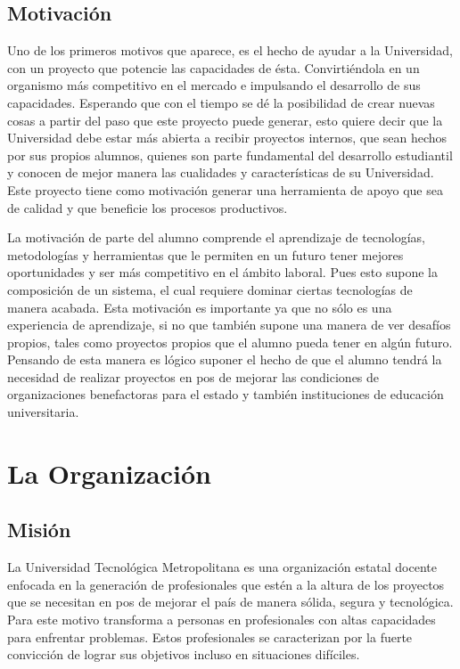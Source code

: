 \documentclass[a4paper,12pt,openany,oneside]{book}
\begin{document}
\section{Motivación}
Uno de los primeros motivos que aparece, es el hecho de ayudar a la Universidad, con un proyecto que potencie las capacidades de ésta. Convirtiéndola en un organismo más competitivo en el mercado e impulsando el desarrollo de sus capacidades. Esperando que con el tiempo se dé la posibilidad de crear nuevas cosas a partir del paso que este proyecto puede generar, esto quiere decir que la Universidad debe estar más abierta a recibir proyectos internos, que sean hechos por sus propios alumnos, quienes son parte fundamental del desarrollo estudiantil y conocen de mejor manera las cualidades y características de su Universidad. Este proyecto tiene como motivación generar una herramienta de apoyo que sea de calidad y que beneficie los procesos productivos.

La motivación de parte del alumno comprende el aprendizaje de tecnologías, metodologías y herramientas que le permiten en un futuro tener mejores oportunidades y ser más competitivo en el ámbito laboral. Pues esto supone la composición de un sistema, el cual requiere dominar ciertas tecnologías de manera acabada. Esta motivación es importante ya que no sólo es una experiencia de aprendizaje, si no que también supone una manera de ver desafíos propios, tales como proyectos propios que el alumno pueda tener en algún futuro. Pensando de esta manera es lógico suponer el hecho de que el alumno tendrá la necesidad de realizar proyectos en pos de mejorar las condiciones de organizaciones benefactoras para el estado y también instituciones de educación universitaria.
\chapter{La Organización}
\thispagestyle{empty}
\section{Misión}
La Universidad Tecnológica Metropolitana es una organización estatal docente enfocada en la generación de profesionales que estén a la altura de los proyectos que se necesitan en pos de mejorar el país de manera sólida, segura y tecnológica. Para este motivo transforma a personas en profesionales con altas capacidades para enfrentar problemas. Estos profesionales se caracterizan por la fuerte convicción de lograr sus objetivos incluso en situaciones difíciles.
\end{document}
